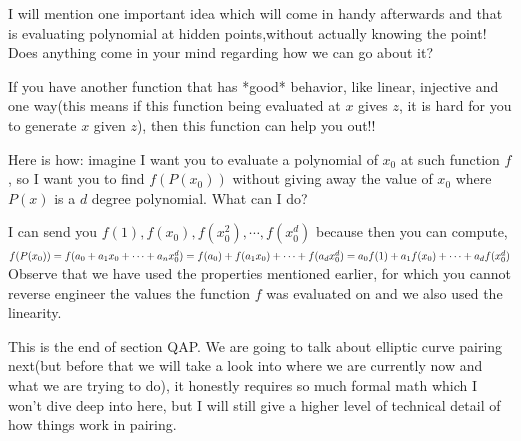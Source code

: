 \documentclass[12pt,letterpaper]{article}
\begin{document}
I will mention one important idea which will come in handy afterwards and that is evaluating polynomial at hidden points,without actually knowing the point! Does anything come in your mind regarding how we can go about it?

If you have another function that has *good* behavior, like linear, injective and one way(this means if this function being evaluated at $x$ gives $z$, it is hard for you to generate $x$ given $z$), then this function can help you out!!

Here is how: imagine I want you to evaluate a polynomial of $x_0$ at such function $f$, so I want you to find $f(P(x_0))$ without giving away the value of $x_0$ where $P(x)$ is a $d$ degree polynomial. What can I do?

I can send you $f(1), f(x_0), f(x_0^2), \cdots, f(x_0^d)$ because then you can compute, $
f(P(x_0)) = f(a_0 + a_1 x_0 + \cdots + a_n x_0^d)\\
= f(a_0) + f(a_1 x_0) + \cdots + f(a_d x_0^d) \\
= a_0 f(1) + a_1 f(x_0) + \cdots + a_d f(x_0^d) 
$
Observe that we have used the properties mentioned earlier, for which you cannot reverse engineer the values the function $f$ was evaluated on and we also used the linearity. 

This is the end of section QAP. We are going to talk about elliptic curve pairing next(but before that we will take a look into where we are currently now and what we are trying to do), it honestly requires so much formal math which I won't dive deep into here, but I will still give a higher level of technical detail of how things work in pairing. 
\end{document}
